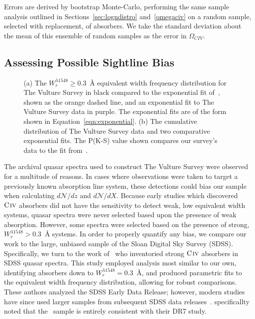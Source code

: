 \documentclass[linenumbers,twocolumn]{aastex61}
\begin{document}
Errors are derived by bootstrap Monte-Carlo, performing the same sample analysis outlined in Sections~\ref{sec:logndistro} and~\ref{omegaciv} on a random sample, selected with replacement, of {\CIV} absorbers.  We take the standard deviation about the mean of this ensemble of random samples as the error in $\Omega_{CIV}$.

\subsection{Assessing Possible Sightline Bias}
\label{sec:bias}

\begin{figure*}[bth]
\caption{(a) The $W_r^{\lambda1548} \ge 0.3$~{\AA} equivalent width frequency distribution for The Vulture Survey in black compared to the exponential fit of~\cite{Cooksey2013}, shown as the orange dashed line, and an exponential fit to The Vulture Survey data in purple. The exponential fits are of the form shown in Equation~\ref{eqn:exponential}. (b) The cumulative distribution of The Vulture Survey data and two comparative exponential fits. The P(K-S) value shown compares our survey's data to the fit from~\cite{Cooksey2013}. }
\label{fig:bias}
\end{figure*}

The archival quasar spectra used to construct The Vulture Survey were observed for a multitude of reasons. In cases where observations were taken to target a previously known absorption line system, these detections could bias our sample when calculating $d\mathcal{N}\!/dz$ and $d\mathcal{N}\!/dX$. Because early studies which discovered ${\hbox{{\rm C}\kern 0.1em{\sc iv}}}$ absorbers did not have the sensitivity to detect weak, low equivalent width systems, quasar spectra were never selected based upon the presence of weak absorption. However, some spectra were selected based on the presence of strong, $W_r^{\lambda1548} > 0.3$~{\AA} systems. In order to properly quantify any bias, we compare our work to the large, unbiased sample of the Sloan Digital Sky Survey (SDSS). Specifically, we turn to the work of~\cite{Cooksey2013} who inventoried strong ${\hbox{{\rm C}\kern 0.1em{\sc iv}}}$ absorbers in SDSS quasar spectra. This study employed analysis most similar to our own, identifying absorbers down to $W_r^{\lambda1548} = 0.3$~{\AA}, and produced parametric fits to the equivalent width frequency distribution, allowing for robust comparisons. These authors analyzed the SDSS Early Data Release; however, modern studies have since used larger samples from subsequent SDSS data releases~\citep{Prochter2006,Lundgren2009,Quider2011,Seyffert2013,Zhu2013,Raghunathan2016}. \cite{Zhu2013} specificallty noted that the~\cite{Cooksey2013} sample is entirely consistent with their DR7 study.
\end{document}
